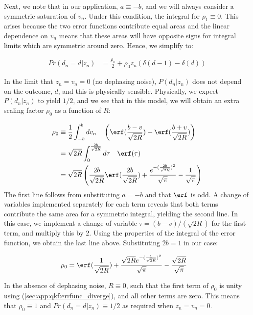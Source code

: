 Next, we note that in our application, $a\equiv -b $, and we will always consider a symmetric saturation of $v_n$. Under this condition, the  integral for $\rho_1 \equiv 0$. This arises because the two error functions contribute equal areas and the linear dependence on $v_n$ means that these areas will have opposite signs for integral limits which are symmetric around zero. Hence, we simplify to:

\begin{align}
   Pr(d_n=d | z_n) & =  \frac{\rho_0}{2}  + \rho_0 z_n \left( \delta(d-1) - \delta(d) \right)   \label{eqn:app:proposedquantiser:2} 
\end{align}

In the limit that $z_n=v_n=0$ (no dephasing noise), $P(d_n|z_n)$ does not depend on the outcome, $d$, and this is physically sensible. Physically, we expect $P(d_n|z_n)$ to yield $1/2$, and we see that in this model, we will obtain an extra scaling factor $\rho_0$ as a function of $R$:

\begin{align}
\rho_0 & \equiv  \frac{1}{2}  \int_{-b}^{b} dv_n \quad
\left(\erf(\frac{b-v}{\sqrt{2R}}) + \erf(\frac{b+v}{\sqrt{2R}})\right) \\
& = \sqrt{2R} \int_{0}^{\frac{2b}{\sqrt{2R}}} d\tau \quad \erf(\tau) \\
& = \sqrt{2R} \left( \frac{2b}{\sqrt{2R}} \erf(\frac{2b}{\sqrt{2R}}) + \frac{e^{-(\frac{2b}{\sqrt{2R}})^2}}{\sqrt{\pi}}  - \frac{1}{\sqrt{\pi}}  \right) 
\end{align}
The first line follows from substituting $a=-b$ and that $\erf$ is odd. A change of variables implemented separately for each term reveals that both terms contribute the same area for a symmetric integral, yielding the second line. In this case, we implement a change of variable $\tau = (b-v)/(\sqrt{2R})$ for the first term, and multiply this by $2$. Using the properties of the integral of the error function, we obtain the last line above. Substituting $2b=1$ in our case:

\begin{align}
\rho_0 & = \erf(\frac{1}{\sqrt{2R}}) + \frac{\sqrt{2R} e^{-(\frac{1}{\sqrt{2R}})^2}}{\sqrt{\pi}}  - \frac{\sqrt{2R}}{\sqrt{\pi}}
\end{align}

In the absence of dephasing noise,  $R \equiv 0$, such that the first term of $\rho_0$ is unity using (\cref{sec:app:qkf:errfunc_diverge}), and all other terms are zero.  This means that $\rho_0 \equiv 1 $ and $Pr(d_n=d | z_n) \equiv 1/2$ as required when $z_n=v_n=0$. 

